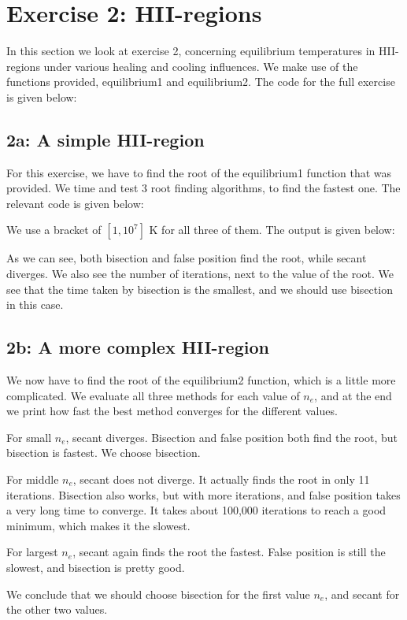 \section{Exercise 2: HII-regions}

In this section we look at exercise 2, concerning equilibrium temperatures in HII-regions under various healing and cooling influences. We make use of the functions provided, equilibrium1 and equilibrium2. The code for the full exercise is given below:



\subsection{2a: A simple HII-region}
For this exercise, we have to find the root of the equilibrium1 function that was provided. We time and test 3 root finding algorithms, to find the fastest one. The relevant code is given below:



We use a bracket of $ [1, 10^7 ] $ K for all three of them. The output is given below:



As we can see, both bisection and false position find the root, while secant diverges. We also see the number of iterations, next to the value of the root. We see that the time taken by bisection is the smallest, and we should use bisection in this case.

\subsection{2b: A more complex HII-region}
We now have to find the root of the equilibrium2 function, which is a little more complicated. We evaluate all three methods for each value of $n_e$, and at the end we print how fast the best method converges for the different values.



For small $n_e$, secant diverges. Bisection and false position both find the root, but bisection is fastest. We choose bisection.

For middle $n_e$, secant does not diverge. It actually finds the root in only 11 iterations. Bisection also works, but with more iterations, and false position takes a very long time to converge. It takes about 100,000 iterations to reach a good minimum, which makes it the slowest.

For largest $n_e$, secant again finds the root the fastest. False position is still the slowest, and bisection is pretty good. 

We conclude that we should choose bisection for the first value $n_e$, and secant for the other two values.


